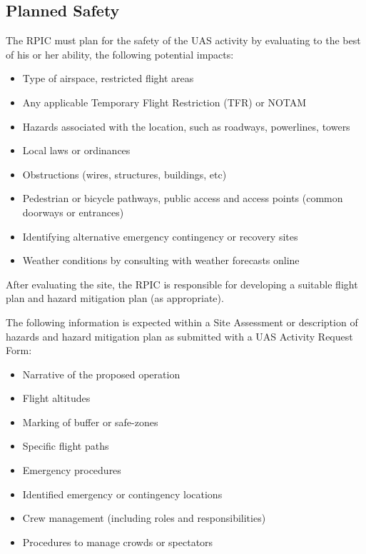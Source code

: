 \documentclass[
]{book}
\providecommand{\tightlist}{%
  \setlength{\itemsep}{0pt}\setlength{\parskip}{0pt}}
\begin{document}
\hypertarget{planned-safety}{%
\subsection{Planned Safety}\label{planned-safety}}

The RPIC must plan for the safety of the UAS activity by evaluating to the best of his or her ability, the following potential impacts:

\begin{itemize}
\tightlist
\item
  Type of airspace, restricted flight areas
\item
  Any applicable Temporary Flight Restriction (TFR) or NOTAM
\item
  Hazards associated with the location, such as roadways, powerlines, towers
\item
  Local laws or ordinances
\item
  Obstructions (wires, structures, buildings, etc)
\item
  Pedestrian or bicycle pathways, public access and access points (common doorways or entrances)
\item
  Identifying alternative emergency contingency or recovery sites
\item
  Weather conditions by consulting with weather forecasts online
\end{itemize}

After evaluating the site, the RPIC is responsible for developing a suitable flight plan and hazard mitigation plan (as appropriate).

The following information is expected within a Site Assessment or description of hazards and hazard mitigation plan as submitted with a UAS Activity Request Form:

\begin{itemize}
\tightlist
\item
  Narrative of the proposed operation
\item
  Flight altitudes
\item
  Marking of buffer or safe-zones
\item
  Specific flight paths
\item
  Emergency procedures
\item
  Identified emergency or contingency locations
\item
  Crew management (including roles and responsibilities)
\item
  Procedures to manage crowds or spectators
\end{itemize}
\end{document}
